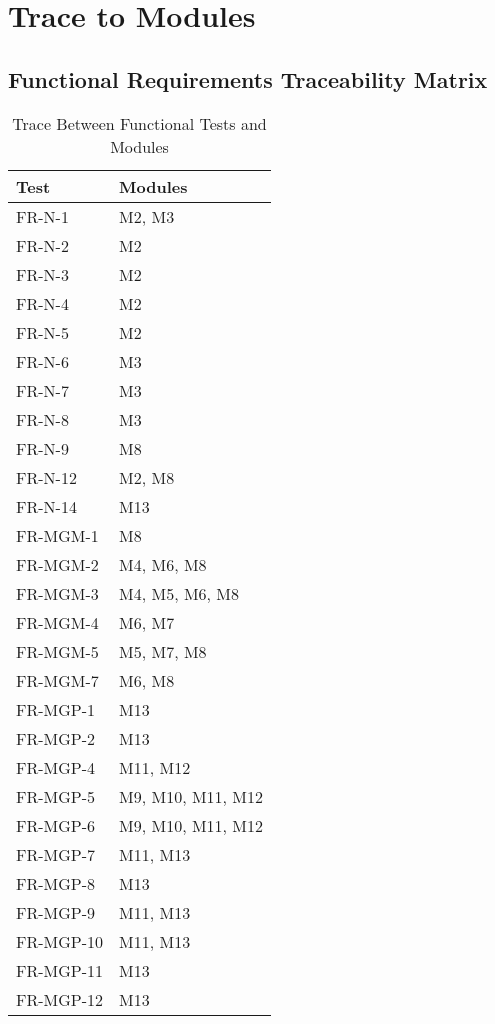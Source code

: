 \documentclass[12pt, titlepage]{article}
\begin{document}
\newpage

\section{Trace to Modules}

\subsection{Functional Requirements Traceability Matrix}
\begin{table}[H]
\centering
\begin{tabular}{p{} p{}}
\toprule
\textbf{Test} & \textbf{Modules}\\
\midrule
FR-N-1 & M2, M3\\
FR-N-2 & M2\\
FR-N-3 & M2\\
FR-N-4 & M2\\
FR-N-5 & M2\\
FR-N-6 & M3\\
FR-N-7 & M3\\
FR-N-8 & M3\\
FR-N-9 & M8\\
FR-N-12 & M2, M8\\
FR-N-14 & M13\\
FR-MGM-1 & M8\\
FR-MGM-2 & M4, M6, M8\\
FR-MGM-3 & M4, M5, M6, M8\\
FR-MGM-4 & M6, M7\\
FR-MGM-5 & M5, M7, M8\\
FR-MGM-7 & M6, M8\\
FR-MGP-1 & M13\\
FR-MGP-2 & M13\\
FR-MGP-4 & M11, M12\\
FR-MGP-5 & M9, M10, M11, M12\\
FR-MGP-6 & M9, M10, M11, M12\\
FR-MGP-7 & M11, M13\\
FR-MGP-8 & M13\\
FR-MGP-9 & M11, M13\\
FR-MGP-10 & M11, M13\\
FR-MGP-11 & M13\\
FR-MGP-12 & M13\\
\bottomrule
\end{tabular}
\caption{Trace Between Functional Tests and Modules}
\label{TblFTM}
\end{table}
\end{document}
